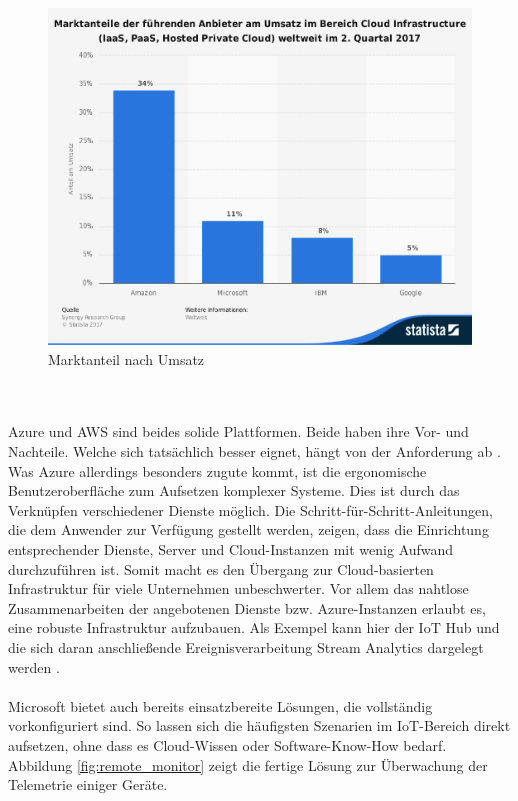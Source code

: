 \begin{figure}[ht!]
	\centering
	\includegraphics[width=1.0\linewidth]{images/statistik}
	\caption{Marktanteil nach Umsatz \cite{Statista.2017b}} %
	\label{fig:statistik}
\end{figure}
\\ \\ Azure und AWS sind beides solide Plattformen. Beide haben ihre Vor- und Nachteile. Welche sich tatsächlich besser eignet, hängt von der Anforderung ab \cite{PeterTsai.2016}. Was Azure allerdings besonders zugute kommt, ist die ergonomische Benutzeroberfläche zum Aufsetzen komplexer Systeme. Dies ist durch das Verknüpfen verschiedener Dienste möglich. Die Schritt-für-Schritt-Anleitungen, die dem Anwender zur Verfügung gestellt werden, zeigen, dass die Einrichtung entsprechender Dienste, Server und Cloud-Instanzen mit wenig Aufwand durchzuführen ist. Somit macht es den Übergang zur Cloud-basierten Infrastruktur für viele Unternehmen unbeschwerter. Vor allem das nahtlose Zusammenarbeiten der angebotenen Dienste bzw. Azure-Instanzen erlaubt es, eine robuste Infrastruktur aufzubauen. Als Exempel kann hier der IoT Hub und die sich daran anschließende Ereignisverarbeitung Stream Analytics dargelegt werden \cite{PeterTsai.2016}.\\ \\
Microsoft bietet auch bereits einsatzbereite Lösungen, die vollständig vorkonfiguriert sind. So lassen sich die häufigsten Szenarien im IoT-Bereich direkt aufsetzen, ohne dass es Cloud-Wissen oder Software-Know-How bedarf. Abbildung \ref{fig:remote_monitor} zeigt die fertige Lösung zur Überwachung der Telemetrie einiger Geräte.
